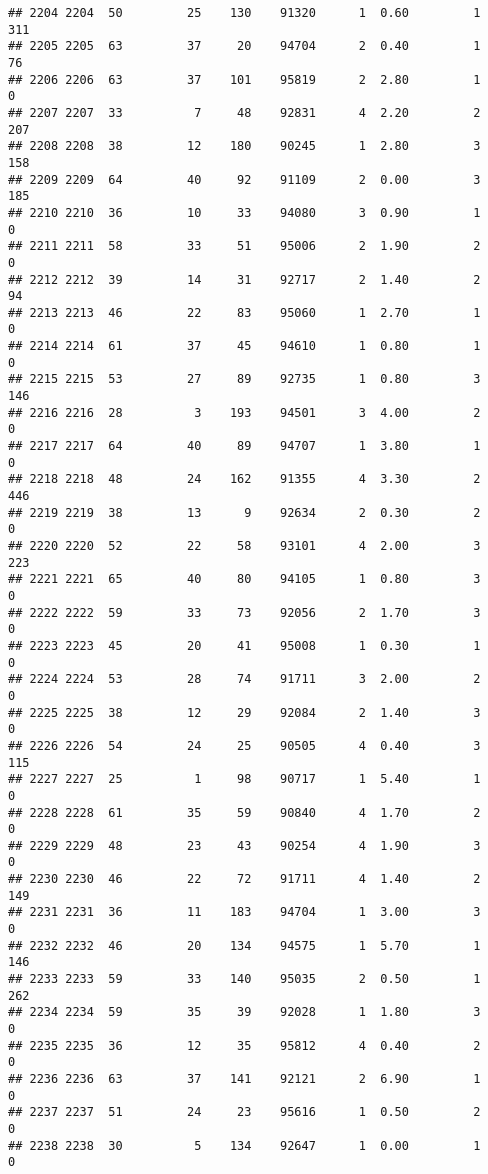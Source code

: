 \documentclass[
]{article}
\begin{document}
\begin{verbatim}
## 2204 2204  50         25    130    91320      1  0.60         1      311
## 2205 2205  63         37     20    94704      2  0.40         1       76
## 2206 2206  63         37    101    95819      2  2.80         1        0
## 2207 2207  33          7     48    92831      4  2.20         2      207
## 2208 2208  38         12    180    90245      1  2.80         3      158
## 2209 2209  64         40     92    91109      2  0.00         3      185
## 2210 2210  36         10     33    94080      3  0.90         1        0
## 2211 2211  58         33     51    95006      2  1.90         2        0
## 2212 2212  39         14     31    92717      2  1.40         2       94
## 2213 2213  46         22     83    95060      1  2.70         1        0
## 2214 2214  61         37     45    94610      1  0.80         1        0
## 2215 2215  53         27     89    92735      1  0.80         3      146
## 2216 2216  28          3    193    94501      3  4.00         2        0
## 2217 2217  64         40     89    94707      1  3.80         1        0
## 2218 2218  48         24    162    91355      4  3.30         2      446
## 2219 2219  38         13      9    92634      2  0.30         2        0
## 2220 2220  52         22     58    93101      4  2.00         3      223
## 2221 2221  65         40     80    94105      1  0.80         3        0
## 2222 2222  59         33     73    92056      2  1.70         3        0
## 2223 2223  45         20     41    95008      1  0.30         1        0
## 2224 2224  53         28     74    91711      3  2.00         2        0
## 2225 2225  38         12     29    92084      2  1.40         3        0
## 2226 2226  54         24     25    90505      4  0.40         3      115
## 2227 2227  25          1     98    90717      1  5.40         1        0
## 2228 2228  61         35     59    90840      4  1.70         2        0
## 2229 2229  48         23     43    90254      4  1.90         3        0
## 2230 2230  46         22     72    91711      4  1.40         2      149
## 2231 2231  36         11    183    94704      1  3.00         3        0
## 2232 2232  46         20    134    94575      1  5.70         1      146
## 2233 2233  59         33    140    95035      2  0.50         1      262
## 2234 2234  59         35     39    92028      1  1.80         3        0
## 2235 2235  36         12     35    95812      4  0.40         2        0
## 2236 2236  63         37    141    92121      2  6.90         1        0
## 2237 2237  51         24     23    95616      1  0.50         2        0
## 2238 2238  30          5    134    92647      1  0.00         1        0

\end{verbatim}
\end{document}
